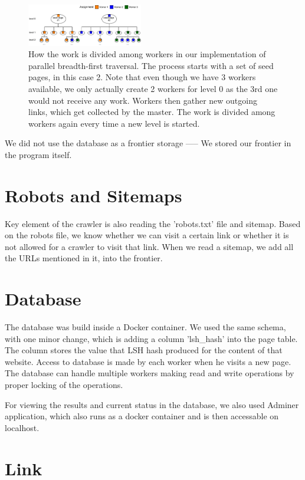 \documentclass[9pt]{IEEEtran}
\begin{document}
\begin{figure}[h] \centering
    \includegraphics[width=0.45\textwidth]{parallel_bfs.pdf}
    \caption{{How the work is divided among workers in our implementation of parallel breadth-first traversal. The process starts with a set of seed pages, in this case 2. Note that even though we have 3 workers available, we only actually create 2 workers for level 0 as the 3rd one would not receive any work. Workers then gather new outgoing links, which get collected by the master. The work is divided among workers again every time a new level is started.}}
    \label{fig:parallel_bfs}
\end{figure}

We did not use the database as a frontier storage ----- We stored our frontier in the program itself.

\section{Robots and Sitemaps}
Key element of the crawler is also reading the 'robots.txt' file and sitemap. Based on the robots file, we know whether we can visit a certain link or whether it is not allowed for a crawler to visit that link.
When we read a sitemap, we add all the URLs mentioned in it, into the frontier. 


\section{Database}\label{section:database}
The database was build inside a Docker container. We used the same schema, with one minor change, which is adding a column 'lsh\_hash' into the page table. The column stores the value that LSH hash produced for the content of that website. Access to database is made by each worker when he visits a new page. The database can handle multiple workers making read and write operations by proper locking of the operations.

For viewing the results and current status in the database, we also used Adminer application, which also runs as a docker container and is then accessable on localhost.


\section{Link}
\end{document}
